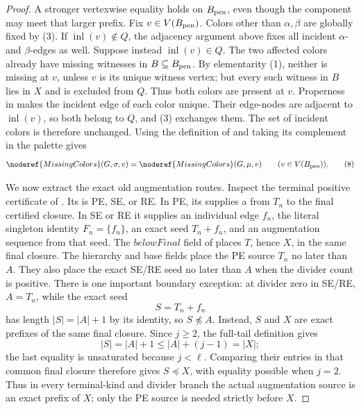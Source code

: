 \begin{proof}
A stronger vertexwise equality holds on \(B_{\rm pen}\), even though
the component may meet that larger prefix.  Fix \(v\in V(B_{\rm pen})\).
Colors other than \(\alpha,\beta\) are globally fixed by (3).  If
\(\operatorname{inl}(v)\notin Q\), the adjacency argument above fixes
all incident \(\alpha\)- and \(\beta\)-edges as well.  Suppose instead
\(\operatorname{inl}(v)\in Q\).  The two affected colors already have
missing witnesses in \(B\subseteq B_{\rm pen}\).  By elementarity (1),
neither is missing at \(v\), unless \(v\) is its unique witness vertex;
but every such witness in \(B\) lies in \(X\) and is excluded from \(Q\).
Thus both colors are present at \(v\).  Properness in
 makes the incident edge of each color
unique.  Their edge-nodes are adjacent to \(\operatorname{inl}(v)\), so
both belong to \(Q\), and (3) exchanges them.  The set of incident colors
is therefore unchanged.  Using the definition of
 and taking its complement in the palette gives
\[
 \noderef{MissingColors}(G,\sigma,v)
 =\noderef{MissingColors}(G,\mu,v)
          \qquad(v\in V(B_{\rm pen})).                         \tag{8}
\]

We now extract the exact old augmentation routes.  Inspect the terminal
positive certificate of .  Its
 is PE, SE, or RE.  In PE, its
 supplies a
 from \(T_n\) to the final
certified closure.  In SE or RE it supplies an individual edge \(f_n\),
the literal singleton identity \(F_n=\{f_n\}\), an exact
 seed \(T_n+f_n\), and an augmentation
sequence from that seed.  The \(\mathit{belowFinal}\) field of
 places \(T\), hence \(X\), in the same
final closure.  The hierarchy and base fields place the PE source
\(T_n\) no later than \(A\).  They also place the exact SE/RE seed no
later than \(A\) when the divider count is positive.  There is one
important boundary exception: at divider zero in SE/RE, \(A=T_n\), while
the exact seed
\[
 S=T_n+f_n
\]
has length \(|S|=|A|+1\) by its
 identity, so \(S\not\preccurlyeq A\).
Instead, \(S\) and \(X\) are exact prefixes of the same final closure.
Since \(j\ge2\), the full-tail definition gives
\[
 |S|=|A|+1\le |A|+(j-1)=|X|;
\]
the last equality is unsaturated because \(j<\ell\).  Comparing their
entries in that common final closure therefore gives
\(S\preccurlyeq X\), with equality possible when \(j=2\).  Thus in every
terminal-kind and divider branch the actual augmentation source is an
exact prefix of \(X\); only the PE source is needed strictly before
\(X\).


\end{proof}
